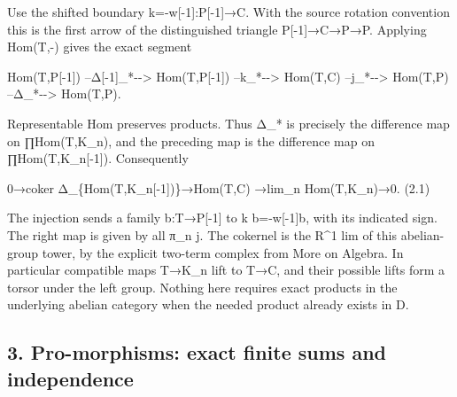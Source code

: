 \documentclass[11pt]{article}
\begin{document}
Use the shifted boundary k\allowbreak{}=-w[-1]\allowbreak{}:\allowbreak{}P[-1]\allowbreak{}\allowbreak{}→C. With the source rotation convention this is the first arrow of the distinguished triangle P[-1]\allowbreak{}\allowbreak{}→C\allowbreak{}→P\allowbreak{}→P. Applying Hom(T,\allowbreak{}-)\allowbreak{} gives the exact segment

Hom(T,\allowbreak{}P[-1]\allowbreak{})\allowbreak{} --Δ[-1]\allowbreak{}\_\allowbreak{}*-\allowbreak{}-> Hom(T,\allowbreak{}P[-1]\allowbreak{})\allowbreak{} --k\_\allowbreak{}*-\allowbreak{}-> Hom(T,\allowbreak{}C)\allowbreak{} --j\_\allowbreak{}*-\allowbreak{}-> Hom(T,\allowbreak{}P)\allowbreak{} --Δ\_\allowbreak{}*-\allowbreak{}-> Hom(T,\allowbreak{}P)\allowbreak{}.

Representable Hom preserves products. Thus Δ\_\allowbreak{}* is precisely the difference map on ∏Hom(T,\allowbreak{}K\_\allowbreak{}n)\allowbreak{},\allowbreak{} and the preceding map is the difference map on ∏Hom(T,\allowbreak{}K\_\allowbreak{}n[-1]\allowbreak{})\allowbreak{}. Consequently

0\allowbreak{}→coker Δ\_\allowbreak{}\{Hom(T,\allowbreak{}K\_\allowbreak{}n[-1]\allowbreak{})\allowbreak{}\}\allowbreak{}→Hom(T,\allowbreak{}C)\allowbreak{} \allowbreak{}→lim\_\allowbreak{}n Hom(T,\allowbreak{}K\_\allowbreak{}n)\allowbreak{}\allowbreak{}→0. (2.1)\allowbreak{}

The injection sends a family b:\allowbreak{}T\allowbreak{}→P[-1]\allowbreak{} to k b\allowbreak{}=-w[-1]\allowbreak{}b,\allowbreak{} with its indicated sign. The right map is given by all π\_\allowbreak{}n j. The cokernel is the R\^{}1 lim of this abelian-group tower,\allowbreak{} by the explicit two-term complex from More on Algebra. In particular compatible maps T\allowbreak{}→K\_\allowbreak{}n lift to T\allowbreak{}→C,\allowbreak{} and their possible lifts form a torsor under the left group. Nothing here requires exact products in the underlying abelian category when the needed product already exists in D.

\subsection{\texorpdfstring{3. Pro-morphisms:\allowbreak{} exact finite sums and independence}{3.  exact finite sums and independence}}\label{proofs-10435-10686-pro-morphisms-exact-finite-sums-and-independence}
\end{document}
